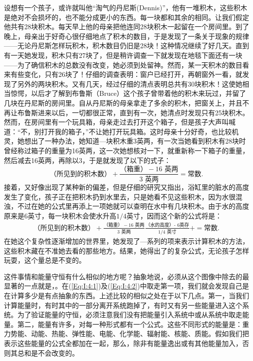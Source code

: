设想有一个孩子，或许就叫他“淘气的丹尼斯(Dennis)”，他有一堆积木，这些积木是绝对不会损坏的，也不能分成更小的东西。每一块都和其余的相同。让我们假定他共有28块积木。每天早上他的母亲把他连同28块积木一起留在一个房间里。到了晚上，母亲出于好奇心很仔细地点了积木的数目，于是发现了一条关于现象的规律——无论丹尼斯怎样玩积木，积木数目仍旧是28块！这种情况继续了好几天。直到有一天她发现，积木只有27块了，但是稍许调查一下就发现在地毯下面还有一块——为了确信积木的总数没有改变，她必须到处留神。然而，某一天积木的数目看来有些变化，只有26块了！仔细的调查表明：窗户已经打开，再朝窗外一看，就发现了另外的两块积木。又有几天，经过仔细的清点表明总共有30块积木！这使她相当惊愕，以后才了解到布鲁斯（Bruce）这个孩子曾带着他的积木来玩过，并留了几块在丹尼斯的房间里。自从丹尼斯的母亲拿走了多余的积木，把窗关上，并且不再让布鲁斯进来以后，一切都很正常，直到有一次，她清点时发现只有25块积木。然而，在房间里有一个玩具箱，母亲走过去打开这个箱子，但是孩子大声叫喊道：“不，别打开我的箱子，”不让她打开玩具箱。这时母亲十分好奇，也比较机灵，她想出了一种办法，她知道—块积木重3英两，有一次当她看到积木有28块时曾经称过箱子的重量为16英两，这一次她想核对一下，就重新称一下箱子的重量，然后减去16英两，再除以3，于是就发现了以下的式子：
\begin{equation}
    \label{Eq:I:4:1}
    \text{（所见到的积木数）}
    +
    \frac{\text{（箱重）}-\text{$16$ 英两}}{\text{$3$ 英两}}=
    \text{常数}.
\end{equation}
接着，又好像出现了某种新的偏差，但是仔细的研究又指出，浴缸里的脏水的高度发生了变化，孩子正在把积木扔到水里去，只是她看不见这些积木，因为水很混浊，不过在她的公式里再添上一项她就可以查明在水中有几块积木。由于水的高度原来是6英寸，每一块积木会使水升高$1/4$英寸，因而这个新的公式将是：
\begin{align}
    \label{Eq:I:4:2}
    \text{（所见到的积木数）}
    +
    \frac{\text{（箱重）}-\text{$16$ 英两}}{\text{$3$ 英两}}
    \frac{\text{（水的高度）- $6$英存}}{\text{$1/4$ 英寸}}+
    =
    \text{常数}.
\end{align}
在她这个复杂性逐渐增加的世界里，她发现了—系列的项来表示计算积木的方法，这些积木藏在不准她去看的那些地方。结果，她得出了的复杂公式，无论孩子怎样玩耍，这个量总是不变的。

这件事情和能量守恒有什么相似的地方呢？抽象地说，必须从这个图像中除去的最显著的一点就是，。在(\ref{Eq:I:4:1})及(\ref{Eq:I:4:2})中取走第一项，我们就会发现自己是在计算多少是有点抽象的东西。上述比较的相似之处在于以下几点。第一，当我们计算能量时，有时其中的一部分离开系统跑掉了，有时又有另一些能量进入这个系统。为了验证能量的守恒，必须注意我们没有把能量引入系统中或从系统中取走能量。第二，能量有许多，对每一种形式都有一个公式。这些不同形式的能量是：重力势能、动能、热能、弹性能、电能、化学能、辐射能、核能、质能。假如我们把表示这些能量的公式全都加在一起，那么，除非有能量逸出或有其他能量加入，否则其总和是不会改变的。

